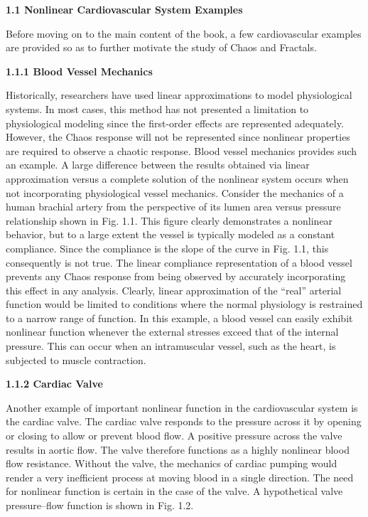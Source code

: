 \documentclass{article}
\begin{document}
\textbf{1.1 Nonlinear Cardiovascular System Examples}

\hfill


Before moving on to the main content of the book, a few cardiovascular examples
are provided so as to further motivate the study of Chaos and Fractals.

\hfill

\textbf{1.1.1 Blood Vessel Mechanics}

\hfill

Historically, researchers have used linear approximations to model physiological
systems. In most cases, this method has not presented a limitation to physiological
modeling since the first-order effects are represented adequately. However, the
Chaos response will not be represented since nonlinear properties are required to
observe a chaotic response. Blood vessel mechanics provides such an example. A
large difference between the results obtained via linear approximation versus a
complete solution of the nonlinear system occurs when not incorporating physiological
vessel mechanics. Consider the mechanics of a human brachial artery from
the perspective of its lumen area versus pressure relationship shown in Fig. 1.1. This
figure clearly demonstrates a nonlinear behavior, but to a large extent the vessel is
typically modeled as a constant compliance. Since the compliance is the slope of the
curve in Fig. 1.1, this consequently is not true. The linear compliance representation
of a blood vessel prevents any Chaos response from being observed by accurately
incorporating this effect in any analysis. Clearly, linear approximation of the “real”
arterial function would be limited to conditions where the normal physiology is
restrained to a narrow range of function. In this example, a blood vessel can easily
exhibit nonlinear function whenever the external stresses exceed that of the internal
pressure. This can occur when an intramuscular vessel, such as the heart, is subjected
to muscle contraction.

\hfill

\textbf{1.1.2 Cardiac Valve}


\hfill

Another example of important nonlinear function in the cardiovascular system is the
cardiac valve. The cardiac valve responds to the pressure across it by opening or
closing to allow or prevent blood flow. A positive pressure across the valve results
in aortic flow. The valve therefore functions as a highly nonlinear blood flow resistance.
Without the valve, the mechanics of cardiac pumping would render a very
inefficient process at moving blood in a single direction. The need for nonlinear
function is certain in the case of the valve. A hypothetical valve pressure–flow function
is shown in Fig. 1.2.
\end{document}
